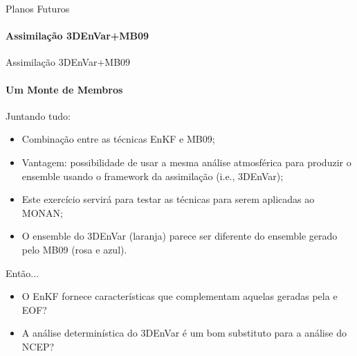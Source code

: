 \documentclass[10pt,aspectratio=169]{beamer}
\begin{document}
\begin{frame}{Planos Futuros}
\framesubtitle{Assimilação 3DEnVar+MB09}
  \vspace{-0.75em}
  \begin{figure}[t]
    \centering
    
  \end{figure}
\end{frame}

\begin{frame}{Assimilação 3DEnVar+MB09}
\framesubtitle{Um Monte de Membros}
  \begin{block}{Juntando tudo:}
    \begin{itemize}
  	  \item Combinação entre as técnicas EnKF e MB09;
  		\pause
  		\item Vantagem: possibilidade de usar a mesma análise atmosférica para produzir o ensemble usando o framework da assimilação (i.e., 3DEnVar);
  		\pause
  		\item Este exercício servirá para testar as técnicas para serem aplicadas ao MONAN;
  		\pause
  		\item O ensemble do 3DEnVar (laranja) parece ser diferente do ensemble gerado pelo MB09 (rosa e azul).
  	\end{itemize}
  \end{block}
  \pause
  \begin{block}{Então...}
  	\begin{itemize}
  		\item O EnKF fornece características que complementam aquelas geradas pela e EOF? 
  		\item A análise determinística do 3DEnVar é um bom substituto para a análise do NCEP?
  	\end{itemize}
  \end{block}
\end{frame}
\end{document}
